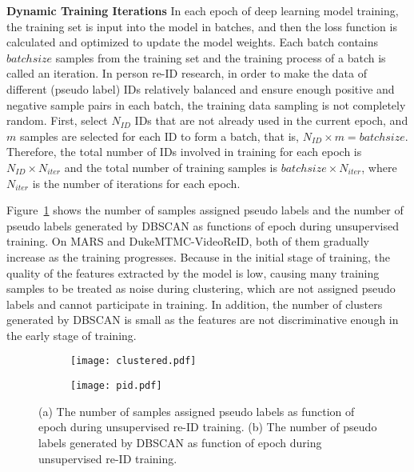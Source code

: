 \documentclass[10pt,twocolumn,letterpaper]{article}
\begin{document}
\noindent \textbf{Dynamic Training Iterations}
In each epoch of deep learning model training, the training set is input into the model in batches, and then the loss function is calculated and optimized to update the model weights. Each batch contains $batchsize$ samples from the training set and the training process of a batch is called an iteration. In person re-ID research, in order to make the data of different (pseudo label) IDs relatively balanced and ensure enough positive and negative sample pairs in each batch, the training data sampling is not completely random. First, select $N_{ID}$ IDs that are not already used in the current epoch, and $m$ samples are selected for each ID to form a batch, that is, $N_{ID} \times m = batchsize$. Therefore, the total number of IDs involved in training for each epoch is $N_{ID} \times N_{iter}$ and the total number of training samples is $batchsize \times N_{iter}$, where $N_{iter}$ is the number of iterations for each epoch.

Figure~\ref{fig:pid-clustered} shows the number of samples assigned pseudo labels and the number of pseudo labels generated by DBSCAN as functions of epoch during unsupervised training. On MARS and DukeMTMC-VideoReID, both of them gradually increase as the training progresses. Because in the initial stage of training, the quality of the features extracted by the model is low, causing many training samples to be treated as noise during clustering, which are not assigned pseudo labels and cannot participate in training. In addition, the number of clusters generated by DBSCAN is small as the features are not discriminative enough in the early stage of training.

\begin{figure}
  \begin{subfigure}[t]{.23\textwidth}
    \centering
    \texttt{[image: clustered.pdf]}
    \caption{}
  \end{subfigure}
  \begin{subfigure}[t]{.23\textwidth}
    \centering
    \texttt{[image: pid.pdf]}
    \caption{}
  \end{subfigure}
  
  \caption{(a) The number of samples assigned pseudo labels as function of epoch during unsupervised re-ID training. (b) The number of pseudo labels generated by DBSCAN as function of epoch during unsupervised re-ID training.}
  \label{fig:pid-clustered}
\end{figure}
\end{document}
